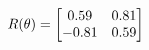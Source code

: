 \documentclass[preview]{standalone}
\begin{document}
\begin{align*}
\special{dvisvgm:raw <g id='unique000'>}R(\theta) = \begin{bmatrix}0.59 & 0.81\\-0.81 & 0.59\end{bmatrix}\special{dvisvgm:raw </g>}
\end{align*}
\end{document}
